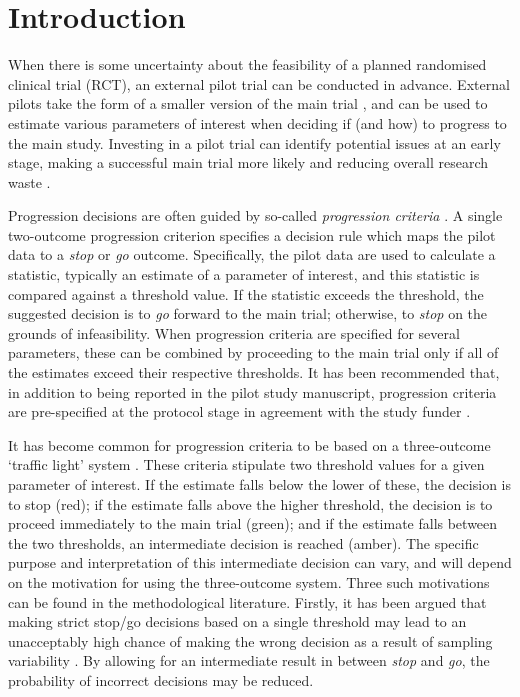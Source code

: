 \documentclass{bmcart}
\begin{document}
\section{Introduction}\label{sec:introduction}

When there is some uncertainty about the feasibility of a planned randomised clinical trial (RCT), an external pilot trial can be conducted in advance. External pilots take the form of a smaller version of the main trial \cite{Eldridge2016}, and can be used to estimate various parameters of interest when deciding if (and how) to progress to the main study. Investing in a pilot trial can identify potential issues at an early stage, making a successful main trial more likely and reducing overall research waste \cite{Morgan2018}.

Progression decisions are often guided by so-called \emph{progression criteria} \cite{Eldridge2016a}. A single two-outcome progression criterion specifies a decision rule which maps the pilot data to a \emph{stop} or \emph{go} outcome. Specifically, the pilot data are used to calculate a statistic, typically an estimate of a parameter of interest, and this statistic is compared against a threshold value. If the statistic exceeds the threshold, the suggested decision is to \emph{go} forward to the main trial; otherwise, to \emph{stop} on the grounds of infeasibility. When progression criteria are specified for several parameters, these can be combined by proceeding to the main trial only if all of the estimates exceed their respective thresholds. It has been recommended that, in addition to being reported in the pilot study manuscript, progression criteria are pre-specified at the protocol stage in agreement with the study funder \cite{NIHR2017, Mbuagbaw2019}.

It has become common for progression criteria to be based on a three-outcome `traffic light' system \cite{Avery2017}. These criteria stipulate two threshold values for a given parameter of interest. If the estimate falls below the lower of these, the decision is to stop (red); if the estimate falls above the higher threshold, the decision is to proceed immediately to the main trial (green); and if the estimate falls between the two thresholds, an intermediate decision is reached (amber). The specific purpose and interpretation of this intermediate decision can vary, and will depend on the motivation for using the three-outcome system. Three such motivations can be found in the methodological literature. Firstly, it has been argued that making strict stop/go decisions based on a single threshold  may lead to an unacceptably high chance of making the wrong decision as a result of sampling variability %
\cite{Eldridge2016a}. By allowing for an intermediate result in between \emph{stop} and \emph{go}, the probability of incorrect decisions may be reduced.
\end{document}
